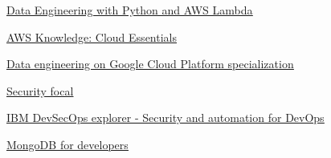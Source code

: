 %
%
%


\begin{coursework}
        {\href{https://www.credly.com/badges/e8689d07-c085-430e-b09b-2be8ac85f56c}
        {\underline{Data Engineering with Python and AWS Lambda}}}

        {\href{https://www.credly.com/badges/4f7ab21d-1b98-4eb3-880a-f3a29fd6ab3d}
        {\underline{AWS Knowledge: Cloud Essentials}}}

        {\href{https://www.coursera.org/account/accomplishments/specialization/certificate/3MKRH4BJ5MKQ}
        {\underline{Data engineering on Google Cloud Platform specialization}}}

        {\href{https://www.credly.com/badges/daac71af-e2a9-40f9-9931-55359be635f5/public_url}
        {\underline{Security focal}}}




        {\href{https://www.credly.com/badges/c8708073-0350-4599-8285-fb6af65a12ea}
        {\underline{IBM DevSecOps explorer - Security and automation for DevOps}}}



        {\href{https://university.mongodb.com/course_completion/30f19185172f43e58ae4a0cd9ce13ff0}
        {\underline{MongoDB for developers}}}


\end{coursework}
